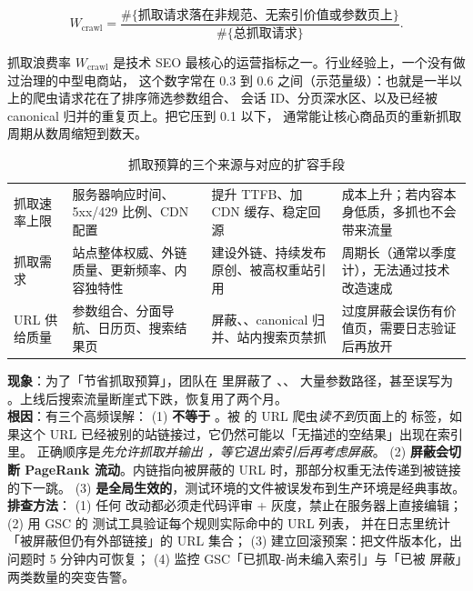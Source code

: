 \begin{equation}
W_{\text{crawl}} = \frac{\#\{\text{抓取请求落在非规范、无索引价值或参数页上}\}}{\#\{\text{总抓取请求}\}} .
\label{eq:crawlwaste}
\end{equation}

抓取浪费率 $W_{\text{crawl}}$ 是技术 SEO 最核心的运营指标之一。行业经验上，一个没有做过治理的中型电商站，
这个数字常在 0.3 到 0.6 之间（示范量级）：也就是一半以上的爬虫请求花在了排序筛选参数组合、
会话 ID、分页深水区、以及已经被 canonical 归并的重复页上。把它压到 0.1 以下，
通常能让核心商品页的重新抓取周期从数周缩短到数天。

\begin{table}[htbp]
\centering
\caption{抓取预算的三个来源与对应的扩容手段}
\label{tab:crawlbudget}
\small
\begin{tabularx}{\textwidth}{L{2.4cm} L{3.3cm} L{3.0cm} Y}
\toprule
{} &  &  &  \\
\midrule
抓取速率上限 & 服务器响应时间、5xx/429 比例、CDN 配置 & 提升 TTFB、加 CDN 缓存、稳定回源 & 成本上升；若内容本身低质，多抓也不会带来流量 \\
抓取需求 & 站点整体权威、外链质量、更新频率、内容独特性 & 建设外链、持续发布原创、被高权重站引用 & 周期长（通常以季度计），无法通过技术改造速成 \\
URL 供给质量 & 参数组合、分面导航、日历页、搜索结果页 &  屏蔽、、canonical 归并、站内搜索页禁抓 & 过度屏蔽会误伤有价值页，需要日志验证后再放开 \\
\bottomrule
\end{tabularx}
\end{table}

\begin{pitfall}
\textbf{现象}：为了「节省抓取预算」，团队在  里屏蔽了 、、
大量参数路径，甚至误写为 。上线后搜索流量断崖式下跌，恢复用了两个月。\\
\textbf{根因}：有三个高频误解：
(1) \textbf{ 不等于 }。被  的 URL 爬虫\emph{读不到}页面上的
 标签，如果这个 URL 已经被别的站链接过，它仍然可能以「无描述的空结果」出现在索引里。
正确顺序是\emph{先允许抓取并输出 ，等它退出索引后再考虑屏蔽}。
(2) \textbf{屏蔽会切断 PageRank 流动}。内链指向被屏蔽的 URL 时，那部分权重无法传递到被链接的下一跳。
(3) \textbf{ 是全局生效的}，测试环境的文件被误发布到生产环境是经典事故。
\\
\textbf{排查方法}：
(1) 任何  改动都必须走代码评审 + 灰度，禁止在服务器上直接编辑；
(2) 用 GSC 的  测试工具验证每个规则实际命中的 URL 列表，
并在日志里统计「被屏蔽但仍有外部链接」的 URL 集合；
(3) 建立回滚预案：把文件版本化，出问题时 5 分钟内可恢复；
(4) 监控 GSC「已抓取-尚未编入索引」与「已被  屏蔽」两类数量的突变告警。
\end{pitfall}


